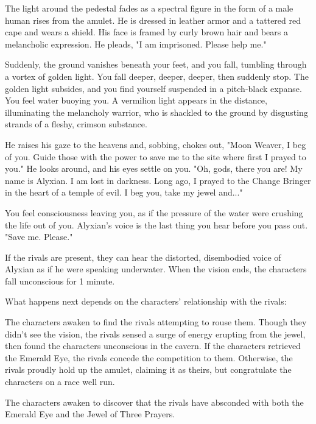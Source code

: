 \documentclass[10pt,a4paper,twoside,twocolumn,openany,nodeprecatedcode]{dndbook}
\begin{document}
\begin{DndReadAloud}{}
The light around the pedestal fades as a spectral figure in the form of a male human rises from the amulet. He is dressed in leather armor and a tattered red cape and wears a shield. His face is framed by curly brown hair and bears a melancholic expression. He pleads, "I am imprisoned. Please help me."

Suddenly, the ground vanishes beneath your feet, and you fall, tumbling through a vortex of golden light. You fall deeper, deeper, deeper, then suddenly stop. The golden light subsides, and you find yourself suspended in a pitch-black expanse. You feel water buoying you. A vermilion light appears in the distance, illuminating the melancholy warrior, who is shackled to the ground by disgusting strands of a fleshy, crimson substance.

He raises his gaze to the heavens and, sobbing, chokes out, "Moon Weaver, I beg of you. Guide those with the power to save me to the site where first I prayed to you." He looks around, and his eyes settle on you. "Oh, gods, there you are! My name is Alyxian. I am lost in darkness. Long ago, I prayed to the Change Bringer in the heart of a temple of evil. I beg you, take my jewel and..."

You feel consciousness leaving you, as if the pressure of the water were crushing the life out of you. Alyxian's voice is the last thing you hear before you pass out. "Save me. Please."

\end{DndReadAloud}

If the rivals are present, they can hear the distorted, disembodied voice of Alyxian as if he were speaking underwater. When the vision ends, the characters fall unconscious for 1 minute.

What happens next depends on the characters' relationship with the rivals:


\begin{description}[nolistsep]
\item[Friendly or Indifferent Rivals.]
The characters awaken to find the rivals attempting to rouse them. Though they didn't see the vision, the rivals sensed a surge of energy erupting from the jewel, then found the characters unconscious in the cavern. If the characters retrieved the Emerald Eye, the rivals concede the competition to them. Otherwise, the rivals proudly hold up the amulet, claiming it as theirs, but congratulate the characters on a race well run.
\item[Hostile Rivals.]
The characters awaken to discover that the rivals have absconded with both the Emerald Eye and the Jewel of Three Prayers.
\end{description}
\end{document}
